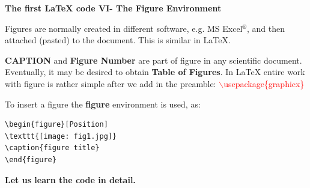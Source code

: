 \documentclass[xcolor=dvipsnames]{beamer}
\begin{document}
\begin{frame}[fragile]{\textbf{The first \LaTeX{} code VI- The Figure Environment}}


\justifying

Figures are normally created in different software, e.g. MS Excel$^\circledR{}$, and then attached (pasted)  to the document. This is similar in \LaTeX{}.\\

\vspace{0.2cm}

\textbf{CAPTION} and \textbf{Figure Number} are part of figure in any scientific document. Eventually, it may be desired to obtain\textbf{ Table of Figures}. In \LaTeX{} entire work with figure is rather simple after we add in the preamble: \textcolor{red}{$\backslash$usepackage\{graphicx\}}\\

\vspace{0.2cm}

To insert a figure the \textbf{figure} environment is used, as:\\

\vspace{0.3cm}


\begin{minipage}{8cm}
\begin{Verbatim}[frame=single]
\begin{figure}[Position]
\texttt{[image: fig1.jpg]}
\caption{figure title}
\end{figure}
\end{Verbatim}
\end{minipage}

\vspace{0.3cm}
\normalfont
\textbf{Let us learn the code in detail.}

\end{frame}
\end{document}
